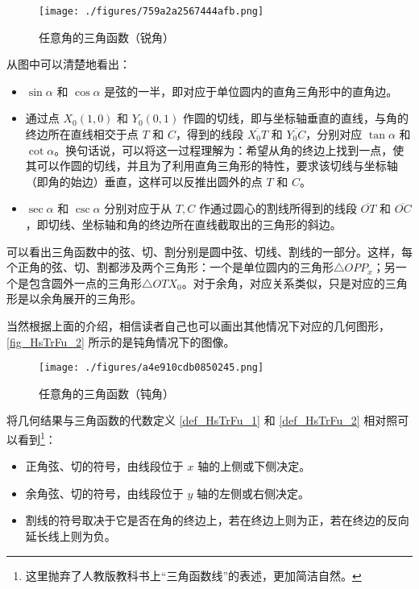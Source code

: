 \begin{figure}[ht]
\centering
\texttt{[image: ./figures/759a2a2567444afb.png]}
\caption{任意角的三角函数（锐角）} \label{fig_HsTrFu_1}
\end{figure}
从图中可以清楚地看出：
\begin{itemize}
\item $\sin\alpha$ 和 $\cos\alpha$ 是弦的一半，即对应于单位圆内的直角三角形中的直角边。
\item 通过点 $X_0(1,0)$ 和 $Y_0(0,1)$ 作圆的切线，即与坐标轴垂直的直线，与角的终边所在直线相交于点 $T$ 和 $C$，得到的线段 $\overline{X_0T}$ 和 $\overline{Y_0C}$，分别对应 $\tan\alpha$ 和 $\cot\alpha$。换句话说，可以将这一过程理解为：希望从角的终边上找到一点，使其可以作圆的切线，并且为了利用直角三角形的特性，要求该切线与坐标轴（即角的始边）垂直，这样可以反推出圆外的点 $T$ 和 $C$。
\item $\sec\alpha$ 和 $\csc\alpha$ 分别对应于从 $T,C$ 作通过圆心的割线所得到的线段 $\overline{OT}$ 和 $\overline{OC}$，即切线、坐标轴和角的终边所在直线截取出的三角形的斜边。
\end{itemize}

可以看出三角函数中的弦、切、割分别是圆中弦、切线、割线的一部分。这样，每个正角的弦、切、割都涉及两个三角形：一个是单位圆内的三角形$\triangle OPP_x$；另一个是包含圆外一点的三角形$\triangle OTX_0$。对于余角，对应关系类似，只是对应的三角形是以余角展开的三角形。

当然根据上面的介绍，相信读者自己也可以画出其他情况下对应的几何图形，\autoref{fig_HsTrFu_2} 所示的是钝角情况下的图像。
\begin{figure}[ht]
\centering
\texttt{[image: ./figures/a4e910cdb0850245.png]}
\caption{任意角的三角函数（钝角）} \label{fig_HsTrFu_2}
\end{figure}
将几何结果与三角函数的代数定义 \autoref{def_HsTrFu_1} 和 \autoref{def_HsTrFu_2} 相对照可以看到\footnote{这里抛弃了人教版教科书上“三角函数线”的表述，更加简洁自然。}：
\begin{itemize}
\item 正角弦、切的符号，由线段位于 $x$ 轴的上侧或下侧决定。
\item 余角弦、切的符号，由线段位于 $y$ 轴的左侧或右侧决定。
\item 割线的符号取决于它是否在角的终边上，若在终边上则为正，若在终边的反向延长线上则为负。
\end{itemize}

